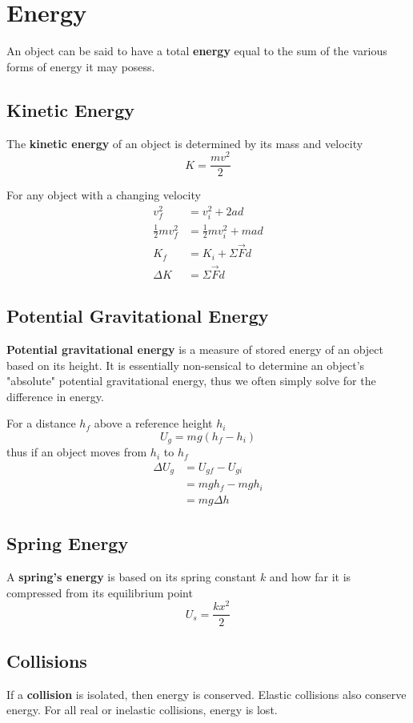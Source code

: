 \documentclass[12pt]{article}
\begin{document}
\section*{Energy}
An object can be said to have a total {\bf energy} equal to the sum of the various forms of energy it may posess.

\subsection*{Kinetic Energy}
The {\bf kinetic energy} of an object is determined by its mass and velocity \[ K = \frac{mv^2}{2} \]

For any object with a changing velocity
\begin{align*}
v_f^2 &= v_i^2 + 2ad\\
\frac{1}{2}mv_f^2 &= \frac{1}{2}mv_i^2 + mad\\
K_f &= K_i + \Sigma\vec{F}d\\
\Delta K &= \Sigma\vec{F}d
\end{align*}

\subsection*{Potential Gravitational Energy}
{\bf Potential gravitational energy} is a measure of stored energy of an object based on its height. It is essentially non-sensical to determine an object's "absolute" potential gravitational energy, thus we often simply solve for the difference in energy.

For a distance $h_f$ above a reference height $h_i$ \[ U_g = mg(h_f-h_i) \] thus if an object moves from $h_i$ to $h_f$
\begin{align*}
\Delta U_g &= U_{gf} - U_{gi}\\
&= mgh_f - mgh_i\\
&= mg\Delta h
\end{align*}

\subsection*{Spring Energy}
A {\bf spring's energy} is based on its spring constant $k$ and how far it is compressed from its equilibrium point \[ U_s = \frac{kx^2}{2} \]

\subsection*{Collisions}
If a {\bf collision} is isolated, then energy is conserved. Elastic collisions also conserve energy. For all real or inelastic collisions, energy is lost.
\end{document}
